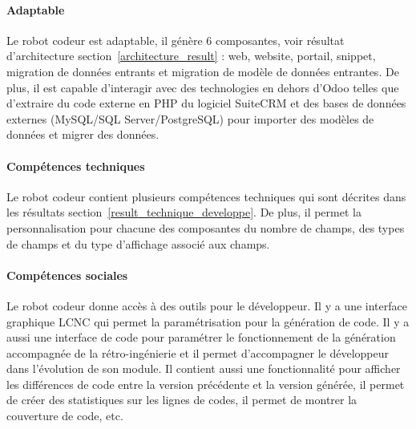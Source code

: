 
\paragraph{Adaptable}
Le robot codeur est adaptable, il génère 6 composantes, voir résultat d'architecture section~\ref{architecture_result} : web, website, portail, snippet, migration de données entrants et migration de modèle de données entrantes. De plus, il est capable d'interagir avec des technologies en dehors d'Odoo telles que d'extraire du code externe en PHP du logiciel SuiteCRM et des bases de données externes (MySQL/SQL Server/PostgreSQL) pour importer des modèles de données et migrer des données.


\paragraph{Compétences techniques}
Le robot codeur contient plusieurs compétences techniques qui sont décrites dans les résultats section~\ref{result_technique_developpe}. De plus, il permet la personnalisation pour chacune des composantes du nombre de champs, des types de champs et du type d'affichage associé aux champs.


\paragraph{Compétences sociales}
Le robot codeur donne accès à des outils pour le développeur. Il y a une interface graphique LCNC qui permet la paramétrisation pour la génération de code. Il y a aussi une interface de code pour paramétrer le fonctionnement de la génération accompagnée de la rétro-ingénierie et il permet d'accompagner le développeur dans l'évolution de son module. Il contient aussi une fonctionnalité pour afficher les différences de code entre la version précédente et la version générée, il permet de créer des statistiques sur les lignes de codes, il permet de montrer la couverture de code, etc.

